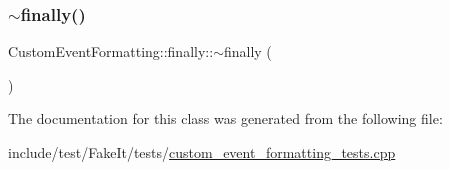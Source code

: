 \subsubsection{\texorpdfstring{$\sim$finally()}{~finally()}}
{\footnotesize\ttfamily Custom\+Event\+Formatting\+::finally\+::$\sim$finally (\begin{DoxyParamCaption}{ }\end{DoxyParamCaption})\hspace{0.3cm}{\ttfamily [inline]}}



The documentation for this class was generated from the following file\+:\begin{DoxyCompactItemize}
\item 
include/test/\+Fake\+It/tests/\mbox{\hyperlink{custom__event__formatting__tests_8cpp}{custom\+\_\+event\+\_\+formatting\+\_\+tests.\+cpp}}\end{DoxyCompactItemize}
